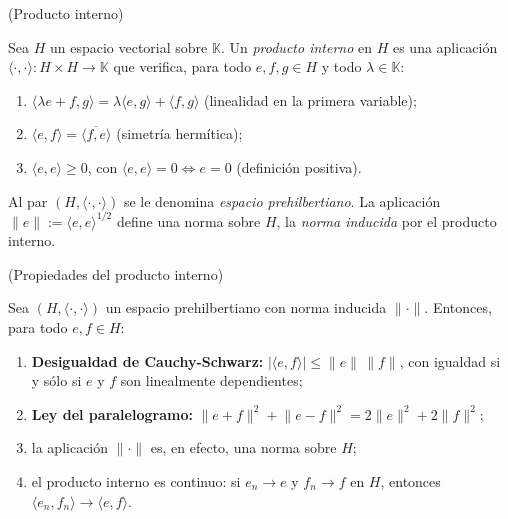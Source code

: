 \begin{Definicion}{(Producto interno)}
\label{ch:preliminares:def:productoInterno}

Sea $H$ un espacio vectorial sobre $\mathbb{K}$. Un \textit{producto interno} en
$H$ es una aplicación $\langle \cdot, \cdot \rangle : H \times H \rightarrow \mathbb{K}$
que verifica, para todo $e, f, g \in H$ y todo $\lambda \in \mathbb{K}$:

\begin{enumerate}
    \item $\langle \lambda e + f, g \rangle = \lambda \langle e, g \rangle + \langle f, g \rangle$ (linealidad en la primera variable);
    \item $\langle e, f \rangle = \overline{\langle f, e \rangle}$ (simetría hermítica);
    \item $\langle e, e \rangle \geq 0$, con $\langle e, e \rangle = 0 \iff e = 0$ (definición positiva).
\end{enumerate}

Al par $(H, \langle \cdot, \cdot \rangle)$ se le denomina \textit{espacio
prehilbertiano}. La aplicación $\lVert e \rVert := \langle e, e \rangle^{1/2}$
define una norma sobre $H$, la \textit{norma inducida} por el producto interno.
\end{Definicion}

\begin{Proposicion}{(Propiedades del producto interno)}
\label{ch:preliminares:prop:propProductoInterno}

Sea $(H, \langle \cdot, \cdot \rangle)$ un espacio prehilbertiano con norma
inducida $\lVert \cdot \rVert$. Entonces, para todo $e, f \in H$:

\begin{enumerate}
    \item \textbf{Desigualdad de Cauchy-Schwarz:} $|\langle e, f \rangle| \leq \lVert e \rVert \, \lVert f \rVert$, con igualdad si y sólo si $e$ y $f$ son linealmente dependientes;

    \item \textbf{Ley del paralelogramo:} $\lVert e + f \rVert^2 + \lVert e - f \rVert^2 = 2\lVert e \rVert^2 + 2\lVert f \rVert^2$;

    \item la aplicación $\lVert \cdot \rVert$ es, en efecto, una norma sobre $H$;

    \item el producto interno es continuo: si $e_n \rightarrow e$ y
    $f_n \rightarrow f$ en $H$, entonces $\langle e_n, f_n \rangle \rightarrow \langle e, f \rangle$.
\end{enumerate}
\end{Proposicion}

